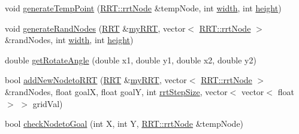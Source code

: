 \begin{DoxyCompactItemize}
\item 
void \hyperlink{classrrt__plan_1_1rrt__planner_aaaab60d718aa349ef2df8dcf0402f207}{generate\-Temp\-Point} (\hyperlink{structRRT_1_1rrtNode}{R\-R\-T\-::rrt\-Node} \&temp\-Node, int \hyperlink{classrrt__plan_1_1rrt__planner_ac74fe436b5e1fa30bda1fbe821369aa2}{width}, int \hyperlink{classrrt__plan_1_1rrt__planner_a3549de56a50bff6494514878b64584df}{height})
\item 
void \hyperlink{classrrt__plan_1_1rrt__planner_ac34f8c3a590fb6f3ba04c99500a8abae}{generate\-Rand\-Nodes} (\hyperlink{classRRT}{R\-R\-T} \&\hyperlink{rrt__planner_8cpp_a51725e16375c08b52f82eb2faa5a921c}{my\-R\-R\-T}, vector$<$ \hyperlink{structRRT_1_1rrtNode}{R\-R\-T\-::rrt\-Node} $>$ \&rand\-Nodes, int \hyperlink{classrrt__plan_1_1rrt__planner_ac74fe436b5e1fa30bda1fbe821369aa2}{width}, int \hyperlink{classrrt__plan_1_1rrt__planner_a3549de56a50bff6494514878b64584df}{height})
\item 
double \hyperlink{classrrt__plan_1_1rrt__planner_a7746337004ecc5a7bdad176b5033b5bc}{get\-Rotate\-Angle} (double x1, double y1, double x2, double y2)
\item 
bool \hyperlink{classrrt__plan_1_1rrt__planner_a22cb05cb13d3027310f3fcc2b394dda6}{add\-New\-Nodeto\-R\-R\-T} (\hyperlink{classRRT}{R\-R\-T} \&\hyperlink{rrt__planner_8cpp_a51725e16375c08b52f82eb2faa5a921c}{my\-R\-R\-T}, vector$<$ \hyperlink{structRRT_1_1rrtNode}{R\-R\-T\-::rrt\-Node} $>$ \&rand\-Nodes, float goal\-X, float goal\-Y, int \hyperlink{rrt_8h_aaac2d108c57a5722b9d816baaed80945}{rrt\-Step\-Size}, vector$<$ vector$<$ float $>$ $>$ grid\-Val)
\item 
bool \hyperlink{classrrt__plan_1_1rrt__planner_a50e32f9cd1421d374ea1aab601433b10}{check\-Nodeto\-Goal} (int X, int Y, \hyperlink{structRRT_1_1rrtNode}{R\-R\-T\-::rrt\-Node} \&temp\-Node)
\end{DoxyCompactItemize}
